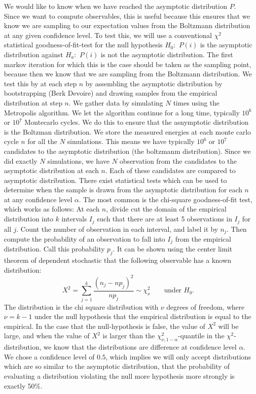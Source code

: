 \documentclass[11pt,english,a4paper]{article}
\begin{document}
We would like to know when we have reached the asymptotic distribution $P$. Since we want to compute observables, this is useful because this ensures  that we know we are sampling to our expectation values from the Boltzmann distribution at any given confidence level. To test this, we will use a conventional $\chi^2$ statistical goodness-of-fit-test for the null hypothesis $H_0:$ $P(i)$ is the asymptotic distribution against $H_a:$ $P(i)$ is not the asymptotic distribution. The first markov iteration for which this is the case should be taken as the sampling point, because then we know that we are sampling from the Boltzmann distribution. We test this by at each step $n$ by assembling the asymptotic distribution by bootstrapping (Berk Devoire) and drawing samples from the empirical distribution at step $n$. We gather data by simulating $N$ times using the Metropolis algorithm. We let the algorithm continue for a long time, typically $10^6$ or $10^7$ Montecarlo cycles. We do this to ensure that the asnymptotic distribution is the Boltzman distribution. We store the measured energies at each monte carlo cycle $n$ for all the $N$ simulations. This means we have typically $10^6$ or $10^7$ candidates to the asymptotic distribution (the boltzmanm distribution). Since we did exactly $N$ simulations, we have $N$ observation from the candidates to the asymptotic distribution at each $n$. Each of these candidates are compared to asymptotic distribution. There exist statistical tests which can be used to determine when the sample is drawn from the asymptotic distribution for each $n$ at any confidence level $\alpha$. The most common is the chi-square goodness-of-fit test, which works as follows: At each $n$, divide cut the domain of the empirical distribution into $k$ intervals $I_j$ such that there are at least 5 observations in $I_j$ for all $j$. Count the number of observation in each interval, and label it by $n_j$. Then compute the probability of an observation to fall into $I_j$ from the empirical distribution. Call this probability $p_j$. It can be shown using the center limit theorem of dependent stochastic that the following observable has a known distribution:
\[
X^2 = \sum_{j=1}^k \frac{(n_j - np_j )^2}{np_j} \sim \chi^2_\nu \qquad \text{under $H_0$}.
\]
The distribution is the chi square distribution with $\nu$ degrees of freedom, where $\nu = k-1$ under the null hypothesis that the empirical distribution is equal to the empirical. In the case that the null-hypothesis is false, the value of $X^2$ will be large, and when the value of $X^2$ is larger than the $\chi^2_{\nu, 1-\alpha}$-quantile in the $\chi^2$-distribution, we know that the distributions are difference at confidence level $\alpha$. We chose a confidence level of $0.5$, which implies we will only accept distributions which are so similar to the asymptotic distribution, that the probability of evaluating a distribution violating the null more hypothesis more strongly is exactly 50\%.
\end{document}
